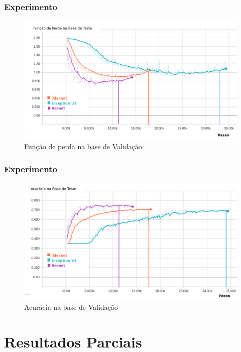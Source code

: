 \documentclass{beamer}
\begin{document}
\begin{frame}
\frametitle{Experimento}
\begin{figure}
\centering
\includegraphics[scale=0.32]{figuras/loss-val.png}
\caption{Função de perda na base de Validação}
\label{fig:arquitetura4}
\end{figure}
\end{frame}

\begin{frame}
\frametitle{Experimento}
\begin{figure}
\centering
\includegraphics[scale=0.32]{figuras/accuracy_val.png}
\caption{Acurácia na base de Validação}
\label{fig:arquitetura4}
\end{figure}
\end{frame}



\section{Resultados Parciais}
\end{document}
